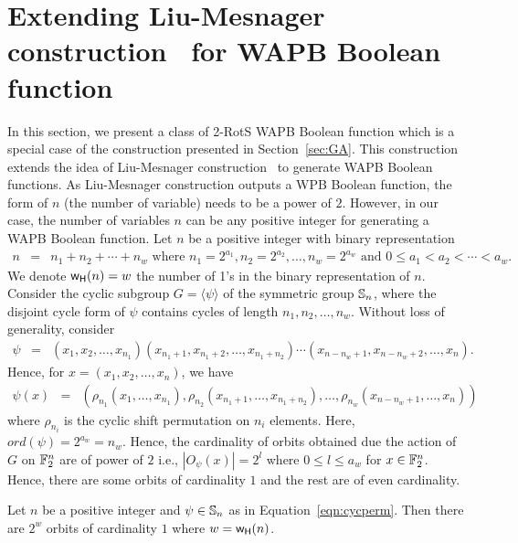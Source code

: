 \documentclass{llncs}
\begin{document}
\section{Extending Liu-Mesnager construction~\cite{DCC:LiuMes19} for WAPB Boolean function}\label{sec:ELM}
In this section, we present a class of 2-RotS WAPB Boolean function which is a special case of the construction presented in Section~\ref{sec:GA}. This construction extends the idea of Liu-Mesnager construction~\cite{DCC:LiuMes19} to generate WAPB Boolean functions. As Liu-Mesnager construction outputs a WPB Boolean function, the form of $n$ (the number of variable) needs to be a power of $2$. However, in our case, the number of variables $n$ can be any positive integer for generating a WAPB Boolean function. Let $n$ be a positive integer with binary representation
\begin{eqnarray}\label{eqn:binn}
n & = & n_1 + n_2 + \cdots + n_w \text{ where } n_1 = 2^{a_1}, n_2 = 2^{a_2}, \ldots, n_w = 2^{a_w} \text{ and } 0 \leq a_1 < a_2 < \cdots < a_w.
\end{eqnarray}
We denote $\mathsf{w_H}(n) = w$ \ie the number of 1's in the binary representation of $n$.
Consider the cyclic subgroup $G = \langle \psi \rangle$ of the symmetric group $\mathbb{S}_n$, where the disjoint cycle form of $\psi$ contains cycles of length $n_1, n_2,  \ldots, n_w$. Without loss of generality, consider 
\begin{eqnarray}\label{eqn:cycperm}
\psi & = & (x_1, x_2, \ldots, x_{n_1}) (x_{n_1+1}, x_{n_1+2}, \ldots, x_{n_1+n_2})\cdots (x_{n-n_w+1}, x_{n-n_w+2}, \ldots, x_n).
\end{eqnarray}
Hence, for $x = (x_1, x_2, \ldots, x_n)$, we have
\begin{eqnarray}\label{eqn:cycperm1}
\psi(x) & = & (\rho_{n_1}(x_1,\ldots,x_{n_1}), \rho_{n_2}(x_{n_1+1},\ldots,x_{n_1+n_2}), \ldots, \rho_{n_w}(x_{n-n_w+1},\ldots,x_n))
\end{eqnarray}
where $\rho_{n_i}$ is the cyclic shift permutation on $n_i$ elements.
Here, $ord(\psi) = 2^{a_w} = n_w$. Hence, the cardinality of orbits obtained due the action of $G$ on $\mathbb{F}_2^n$ are of power of $2$ i.e., $|O_\psi(x)| = 2^l$ where $0 \leq l \leq a_w$ for $x \in \mathbb{F}_2^n$.
Hence, there are some orbits of cardinality $1$ and the rest are of even cardinality. 
\begin{lemma}\label{lem:orbNo}
Let $n$ be a positive integer and $\psi \in \mathbb{S}_n$ as in Equation~\ref{eqn:cycperm}. Then there are $2^w$ orbits of cardinality $1$ where $w = \mathsf{w_H}(n)$.
\end{lemma}
\end{document}
